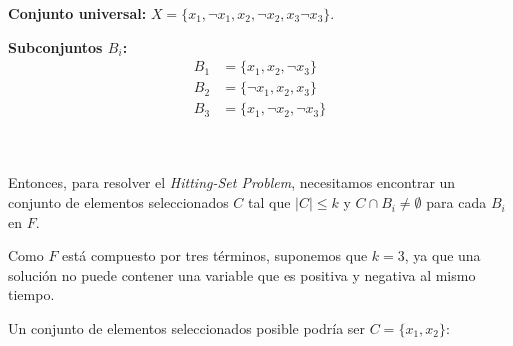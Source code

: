 \documentclass{estilo}
\begin{document}
\begin{minipage}[t]{0.7\textwidth}
    \textbf{Conjunto universal:} \(X = \{x_1, \neg x_1, x_2, \neg x_2, x_3 \neg x_3\}\).

    \vspace{0.5cm}

    \textbf{Subconjuntos \(B_i\):}
    \begin{align*}
        B_1 & = \{x_1, x_2, \neg x_3\} \\
        B_2 & = \{\neg x_1, x_2, x_3\} \\
        B_3 & = \{x_1, \neg x_2, \neg x_3\}
    \end{align*}
\end{minipage}
\hfill
\begin{minipage}[t]{0.3\textwidth}
\end{minipage} \\ \\

Entonces, para resolver el \textit{Hitting-Set Problem}, necesitamos encontrar un conjunto de elementos seleccionados \(C\) tal que \(|C| \leq k\) y \(C \cap B_i \neq \emptyset\) para cada \(B_i\) en \(F\).

Como $F$ está compuesto por tres términos, suponemos que $k = 3$, ya que una solución no puede contener una variable que es positiva y negativa al mismo tiempo. 

Un conjunto de elementos seleccionados posible podría ser \(C = \{x_1, x_2\}\):
\end{document}
